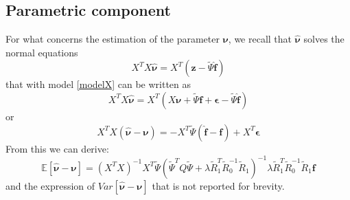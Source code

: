 \subsection{Parametric component}
For what concerns the estimation of the parameter $\bm{\nu}$, we recall that
$\hat{\bm{\nu}}$ solves the normal equations
\begin{equation}
	X^T X \hat{\bm{\nu}} = X^T \left( \bm{z} - \tilde{\Psi} \hat{\bm{f}} \right)
\end{equation}
that with model \ref{modelX} can be written as
\begin{equation}
	X^T X \hat{\bm{\nu}} =
	X^T \left( X \bm{\nu} + \tilde{\Psi} \bm{f} + \bm{\epsilon}
	- \tilde{\Psi} \hat{\bm{f}} \right)
\end{equation}
or
\begin{equation}
	X^T X \left(\hat{\bm{\nu}} - \bm{\nu}\right)= -
	X^T \tilde{\Psi} \left( \hat{\bm{f}} - \bm{f} \right)
	+ X^T \bm{\epsilon}
\end{equation}
From this we can derive:
\begin{equation}
	\mathbb{E}\left[\hat{\bm{\nu}} - \bm{\nu}\right] =
	\left(X^T X\right)^{-1} X^T
	\tilde{\Psi}\left(\tilde{\Psi}^TQ\tilde{\Psi} +\lambda \tilde{R}_1^T \tilde{R}_0^{-1} \tilde{R}_1 \right)^{-1}
	\lambda \tilde{R}_1^T \tilde{R}_0^{-1} \tilde{R}_1 \bm{f}
\end{equation}
and the expression of $Var \left[\hat{\bm{\nu}} - \bm{\nu}\right]$
that is not reported for brevity.

%
